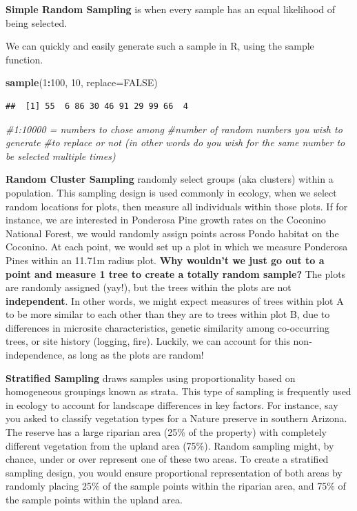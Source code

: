 \documentclass[
]{book}
\newenvironment{Shaded}{\begin{snugshade}}{\end{snugshade}}
\newcommand{\AttributeTok}[1]{\textcolor[rgb]{0.13,0.29,0.53}{#1}}
\newcommand{\CommentTok}[1]{\textcolor[rgb]{0.56,0.35,0.01}{\textit{#1}}}
\newcommand{\ConstantTok}[1]{\textcolor[rgb]{0.56,0.35,0.01}{#1}}
\newcommand{\DecValTok}[1]{\textcolor[rgb]{0.00,0.00,0.81}{#1}}
\newcommand{\FunctionTok}[1]{\textcolor[rgb]{0.13,0.29,0.53}{\textbf{#1}}}
\newcommand{\NormalTok}[1]{#1}
\newcommand{\SpecialCharTok}[1]{\textcolor[rgb]{0.81,0.36,0.00}{\textbf{#1}}}
\begin{document}
\textbf{Simple Random Sampling} is when every sample has an equal likelihood of being selected.

We can quickly and easily generate such a sample in R, using the sample function.

\begin{Shaded}
\begin{Highlighting}[]
\FunctionTok{sample}\NormalTok{(}\DecValTok{1}\SpecialCharTok{:}\DecValTok{100}\NormalTok{, }\DecValTok{10}\NormalTok{, }\AttributeTok{replace=}\ConstantTok{FALSE}\NormalTok{)}
\end{Highlighting}
\end{Shaded}

\begin{verbatim}
##  [1] 55  6 86 30 46 91 29 99 66  4
\end{verbatim}

\begin{Shaded}
\begin{Highlighting}[]
\CommentTok{\#1:10000 = numbers to chose among }
\CommentTok{\#number of random numbers you wish to generate}
\CommentTok{\#to replace or not (in other words do you wish for the same number to be selected multiple times)}
\end{Highlighting}
\end{Shaded}

\textbf{Random Cluster Sampling} randomly select groups (aka clusters) within a population. This sampling design is used commonly in ecology, when we select random locations for plots, then measure all individuals within those plots. If for instance, we are interested in Ponderosa Pine growth rates on the Coconino National Forest, we would randomly assign points across Pondo habitat on the Coconino. At each point, we would set up a plot in which we measure Ponderosa Pines within an 11.71m radius plot. \textbf{Why wouldn't we just go out to a point and measure 1 tree to create a totally random sample?} The plots are randomly assigned (yay!), but the trees within the plots are not \textbf{independent}. In other words, we might expect measures of trees within plot A to be more similar to each other than they are to trees within plot B, due to differences in microsite characteristics, genetic similarity among co-occurring trees, or site history (logging, fire). Luckily, we can account for this non-independence, as long as the plots are random!

\textbf{Stratified Sampling} draws samples using proportionality based on homogeneous groupings known as strata. This type of sampling is frequently used in ecology to account for landscape differences in key factors. For instance, say you asked to classify vegetation types for a Nature preserve in southern Arizona. The reserve has a large riparian area (25\% of the property) with completely different vegetation from the upland area (75\%). Random sampling might, by chance, under or over represent one of these two areas. To create a stratified sampling design, you would ensure proportional representation of both areas by randomly placing 25\% of the sample points within the riparian area, and 75\% of the sample points within the upland area.
\end{document}
